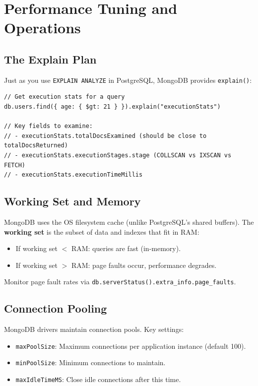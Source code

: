 \documentclass[12pt,a4paper]{article}
\begin{document}
\section{Performance Tuning and Operations}

\subsection{The Explain Plan}

Just as you use \texttt{EXPLAIN ANALYZE} in PostgreSQL, MongoDB provides \texttt{explain()}:

\begin{lstlisting}[language=MongoDB]
// Get execution stats for a query
db.users.find({ age: { $gt: 21 } }).explain("executionStats")

// Key fields to examine:
// - executionStats.totalDocsExamined (should be close to totalDocsReturned)
// - executionStats.executionStages.stage (COLLSCAN vs IXSCAN vs FETCH)
// - executionStats.executionTimeMillis
\end{lstlisting}

\subsection{Working Set and Memory}

MongoDB uses the OS filesystem cache (unlike PostgreSQL's shared buffers). The \textbf{working set} is the subset of data and indexes that fit in RAM:
\begin{itemize}[noitemsep]
    \item If working set $<$ RAM: queries are fast (in-memory).
    \item If working set $>$ RAM: page faults occur, performance degrades.
\end{itemize}

Monitor page fault rates via \texttt{db.serverStatus().extra\_info.page\_faults}.

\subsection{Connection Pooling}

MongoDB drivers maintain connection pools. Key settings:
\begin{itemize}[noitemsep]
    \item \texttt{maxPoolSize}: Maximum connections per application instance (default 100).
    \item \texttt{minPoolSize}: Minimum connections to maintain.
    \item \texttt{maxIdleTimeMS}: Close idle connections after this time.
\end{itemize}
\end{document}
